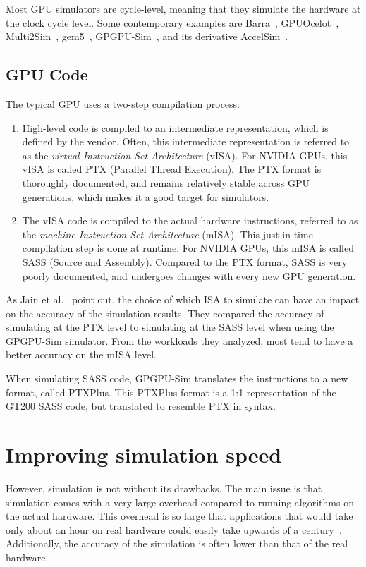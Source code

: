 Most GPU simulators are cycle-level, meaning that they simulate the hardware at the clock cycle level.
Some contemporary examples are Barra~\cite{barra}, GPUOcelot~\cite{ocelot}, Multi2Sim~\cite{multi2sim}, gem5~\cite{gem5}, GPGPU-Sim~\cite{gpgpu-sim}, and its derivative AccelSim~\cite{accelsim}.

\subsection{GPU Code}\label{subsec:gpu-code}
The typical GPU uses a two-step compilation process:
\begin{enumerate}
    \item High-level code is compiled to an intermediate representation, which is defined by the vendor.
    Often, this intermediate representation is referred to as the \textit{virtual Instruction Set Architecture} (vISA).
    For NVIDIA GPUs, this vISA is called PTX (Parallel Thread Execution).
    The PTX format is thoroughly documented, and remains relatively stable across GPU generations, which makes it a good target for simulators.
    \item The vISA code is compiled to the actual hardware instructions, referred to as the \textit{machine Instruction Set Architecture} (mISA).
    This just-in-time compilation step is done at runtime.
    For NVIDIA GPUs, this mISA is called SASS (Source and Assembly).
    Compared to the PTX format, SASS is very poorly documented, and undergoes changes with every new GPU generation.
\end{enumerate}

As Jain et al.~\cite{sim-method} point out, the choice of which ISA to simulate can have an impact on the accuracy of the simulation results.
They compared the accuracy of simulating at the PTX level to simulating at the SASS level when using the GPGPU-Sim simulator.
From the workloads they analyzed, most tend to have a better accuracy on the mISA level.

When simulating SASS code, GPGPU-Sim translates the instructions to a new format, called PTXPlus.
This PTXPlus format is a 1:1 representation of the GT200 SASS code, but translated to resemble PTX in syntax.

\section{Improving simulation speed}\label{sec:improving-simulation-speed}
However, simulation is not without its drawbacks.
The main issue is that simulation comes with a very large overhead compared to running algorithms on the actual hardware.
This overhead is so large that applications that would take only about an hour on real hardware could easily take upwards of a century~\cite{pks}.
Additionally, the accuracy of the simulation is often lower than that of the real hardware.

